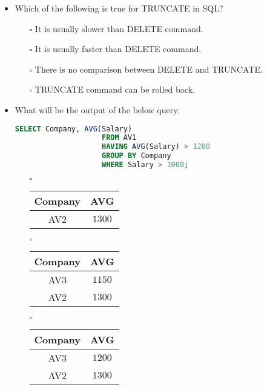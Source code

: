 \documentclass[10pt]{article}
\newcommand{\lightrule}{%
	\arrayrulecolor{black!30}%
	\midrule[\lightrulewidth]%
	\arrayrulecolor{black}}
\begin{document}
\begin{itemize}
			\item Which of the following is true for TRUNCATE in SQL?
			\begin{enumerate}
					\item[$\square$] It is usually slower than DELETE command.
					\item[$\square$] It is usually faster than DELETE command.
					\item[$\square$] There is no comparison between DELETE and TRUNCATE.
					\item[$\square$] TRUNCATE command can be rolled back.
				\end{enumerate}

			\item What will be the output of the below query: 
				\begin{lstlisting}[language=SQL,firstline=1, lastline=5] 
					SELECT Company, AVG(Salary) 
					FROM AV1 
					HAVING AVG(Salary) > 1200 
					GROUP BY Company 
					WHERE Salary > 1000;
				\end{lstlisting}

				\begin{enumerate}
					\item[$\square$]
						\begin{tabular}{@{} *{2}{c} @{}}
							\toprule
								\textbf{Company} & \textbf{AVG} \\
							\midrule
								AV2 & $1300$ \\
							\bottomrule
						\end{tabular}

					\item[$\square$]
						\begin{tabular}{@{} *{2}{c} @{}}
							\toprule
								\textbf{Company} & \textbf{AVG} \\
							\midrule
								AV3 & $1150$ \\
							\lightrule
								AV2 & $1300$ \\
							\bottomrule
						\end{tabular}

					\item[$\square$]
						\begin{tabular}{@{} *{2}{c} @{}}
							\toprule
								\textbf{Company} & \textbf{AVG} \\
							\midrule
								AV3 & $1200$ \\
							\lightrule
								AV2 & $1300$ \\
							\bottomrule
						\end{tabular}


\end{enumerate}
\end{itemize}
\end{document}
